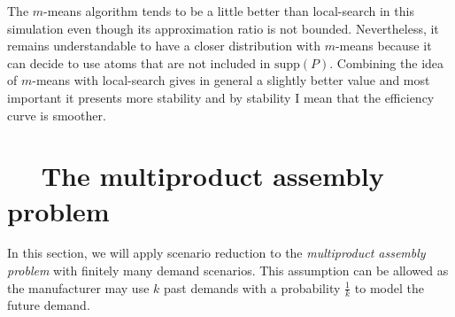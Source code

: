 \documentclass{amsart}
\begin{document}
The $m$-means algorithm tends to be a little better than local-search in this simulation even though its approximation ratio is not bounded. Nevertheless, it remains understandable to have a closer distribution with $m$-means because it can decide to use atoms that are not included in $\text{supp}\left(P\right)$. Combining the idea of $m$-means with local-search gives in general a slightly better value and most important it presents more stability and by stability I mean that the efficiency curve is smoother.

\section{$\quad$ The multiproduct assembly problem}\label{section mpa}
In this section, we will apply scenario reduction to the \emph{multiproduct assembly problem} with finitely many demand scenarios. This assumption can be allowed as the manufacturer may use $k$ past demands with a probability $\frac{1}{k}$ to model the future demand.
\end{document}
